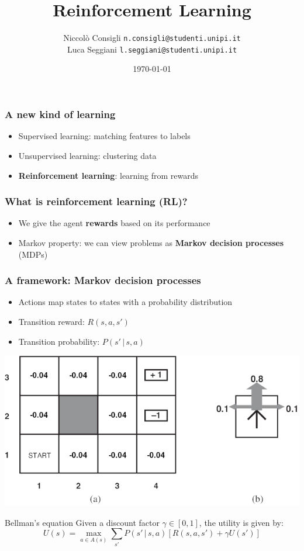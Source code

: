 \documentclass{beamer}
\title{Reinforcement Learning}
\author{
    Niccolò Consigli
		\scriptsize \texttt{n.consigli@studenti.unipi.it}
		\\
		\normalsize
    Luca Seggiani
		\scriptsize \texttt{l.seggiani@studenti.unipi.it}
		\normalsize
	}
\institute{Università di Pisa}
\date{\today}
\begin{document}
\begin{frame}
	\titlepage
\end{frame}

\begin{frame}
	\frametitle{A new kind of learning}
	\begin{itemize}
		\item<1-> Supervised learning: matching features to labels
		\item<2-> Unsupervised learning: clustering data
		\item<3-> \textbf{Reinforcement learning}: learning from rewards
	\end{itemize}
\end{frame}

\begin{frame}
	\frametitle{What is reinforcement learning (RL)?}
	\begin{itemize}
		\item<1-> We give the agent \textbf{rewards} based on its performance
		\item<2-> Markov property: we can view problems as \textbf{Markov decision processes} (MDPs)
	\end{itemize}
\end{frame}

\begin{frame}
	\frametitle{A framework: Markov decision processes}
	\begin{itemize}
		\item Actions map states to states with a probability distribution
		\item Transition reward: $R(s, a, s')$
		\item Transition probability: $P(s' \, | \, s, a)$
	\end{itemize}
	\begin{center}
		\includegraphics[scale=0.95]{figures/markov-decisional-process.png}
	\end{center}
	\pause
	\begin{block}{Bellman's equation}
		Given a discount factor $\gamma \in [0, 1]$, the utility is given by:
		$$
		U(s) = \max_{a \in A(s)} \sum_{s'} P(s' \, | \, s, a) \left[ R(s, a, s') + \gamma U(s') \right]
		$$
	\end{block}
\end{frame}
\end{document}
